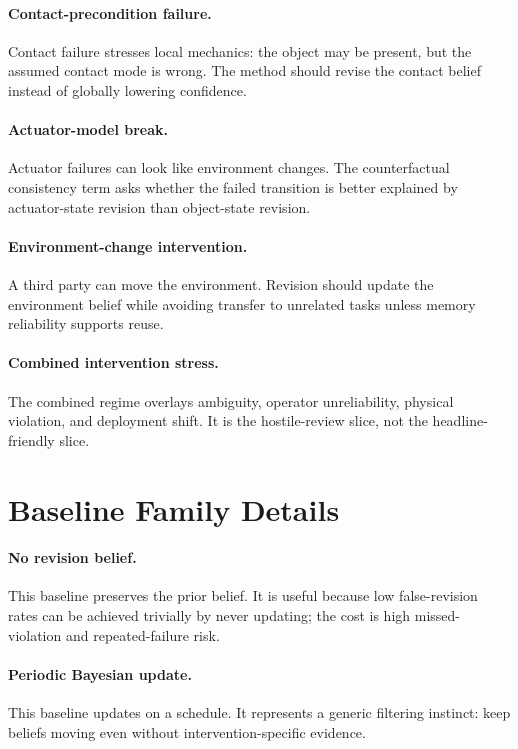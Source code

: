 \documentclass{article}
\begin{document}
\paragraph{Contact-precondition failure.} Contact failure stresses local mechanics: the object may be present, but the assumed contact mode is wrong. The method should revise the contact belief instead of globally lowering confidence.

\paragraph{Actuator-model break.} Actuator failures can look like environment changes. The counterfactual consistency term asks whether the failed transition is better explained by actuator-state revision than object-state revision.

\paragraph{Environment-change intervention.} A third party can move the environment. Revision should update the environment belief while avoiding transfer to unrelated tasks unless memory reliability supports reuse.

\paragraph{Combined intervention stress.} The combined regime overlays ambiguity, operator unreliability, physical violation, and deployment shift. It is the hostile-review slice, not the headline-friendly slice.

\clearpage
\section{Baseline Family Details}
\paragraph{No revision belief.} This baseline preserves the prior belief. It is useful because low false-revision rates can be achieved trivially by never updating; the cost is high missed-violation and repeated-failure risk.

\paragraph{Periodic Bayesian update.} This baseline updates on a schedule. It represents a generic filtering instinct: keep beliefs moving even without intervention-specific evidence.
\end{document}
